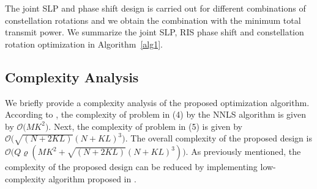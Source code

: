 \documentclass[10pt,conference]{IEEEtran}
\newcommand{\bfH}{\mathbf{H}}
\newcommand{\bfh}{\mathbf{h}}
\newcommand{\bfw}{\mathbf{w}}
\newcommand{\bfX}{\mathbf{X}}
\newcommand{\bfx}{\mathbf{x}}
\newcommand{\bftheta}{\boldsymbol{\theta}}
\newcommand{\bfepsilon}{\boldsymbol{\epsilon}}
\begin{document}
The joint SLP and phase shift design is carried out for different combinations of constellation rotations and we obtain the combination with the minimum total transmit power. We summarize the joint  SLP, RIS phase shift and constellation rotation optimization in Algorithm~\ref{alg1}.
\begin{algorithm}[h!]
 \end{algorithm}

\subsection{Complexity Analysis} We briefly provide a complexity analysis of the proposed optimization algorithm. According to \cite{bro1997fast}, the complexity of problem in (4) by the NNLS algorithm is given by $\mathcal{O}\bigl(MK^2)$. Next, the complexity of problem in (5) is given by $\mathcal{O}\bigl(\sqrt{(N+2KL)}(N+KL)^3)$. The overall complexity of the proposed design is $\mathcal{O}\bigl(Q\boldsymbol{\varrho}(MK^2+\sqrt{(N+2KL)}(N+KL)^3))$. As previously mentioned, the complexity of the proposed design can be reduced by implementing low-complexity algorithm proposed in \cite{9984648}. 
\end{document}
